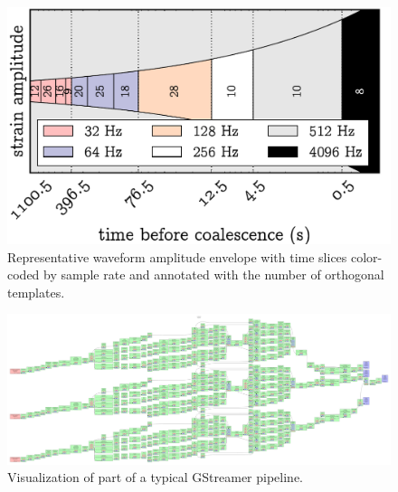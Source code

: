 \documentclass[portrait,plainboxedsections]{sciposter}
\begin{document}
\begin{minipage}[t]{0.25\textwidth}
\begin{figure}
\includegraphics{figures/envelope}
\caption{\label{fig:time_slices} Representative waveform amplitude envelope with time slices color-coded by sample rate and annotated with the number of orthogonal templates.}
\end{figure}

\begin{figure}
\includegraphics[width=\textwidth]{figures/network}
\caption{\label{fig:gstreamer}Visualization of part of a typical GStreamer pipeline.}
\end{figure}

\end{minipage}
\end{document}
